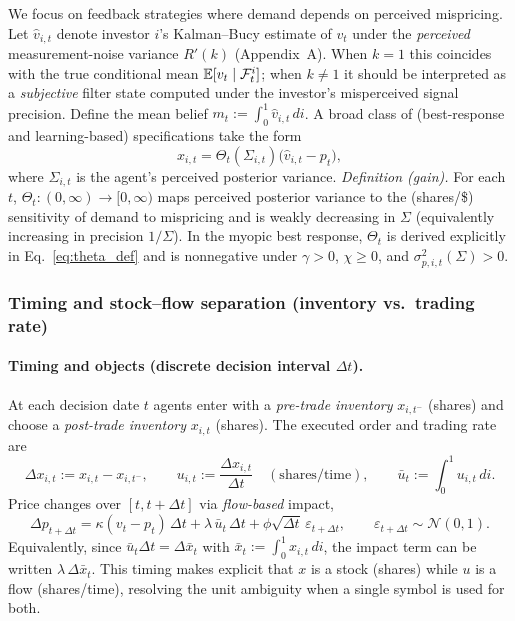 We focus on feedback strategies where demand depends on perceived mispricing. Let $\hat v_{i,t}$ denote investor $i$'s Kalman--Bucy estimate of $v_t$ under the \emph{perceived} measurement-noise variance $R'(k)$ (Appendix~A). When $k=1$ this coincides with the true conditional mean $\mathbb{E}[v_t\mid \mathcal F^i_t]$; when $k\ne 1$ it should be interpreted as a \emph{subjective} filter state computed under the investor's misperceived signal precision. Define the mean belief $m_t := \int_0^1 \hat v_{i,t}\,di$. A broad class of (best-response and learning-based) specifications take the form
\begin{equation}
x_{i,t} = \Theta_t(\Sigma_{i,t})\bigl(\hat v_{i,t}-p_t\bigr),
\label{eq:lin_policy}
\end{equation}
where $\Sigma_{i,t}$ is the agent's perceived posterior variance.
\emph{Definition (gain).} For each $t$, $\Theta_t:(0,\infty)\to[0,\infty)$ maps perceived posterior variance to the (shares/\$) sensitivity of demand to mispricing and is weakly decreasing in $\Sigma$ (equivalently increasing in precision $1/\Sigma$). In the myopic \CARA best response, $\Theta_t$ is derived explicitly in Eq.~\eqref{eq:theta_def} and is nonnegative under $\gamma>0$, $\chi\ge0$, and $\sigma^2_{p,i,t}(\Sigma)>0$.

\subsubsection{Timing and stock--flow separation (inventory vs.\ trading rate)}
\label{subsubsec:timing_stock_flow}

\paragraph{Timing and objects (discrete decision interval $\Delta t$).}
At each decision date $t$ agents enter with a \emph{pre-trade inventory} $x_{i,t^-}$ (shares) and choose a \emph{post-trade inventory} $x_{i,t}$ (shares). The executed order and trading rate are
\[
\Delta x_{i,t} := x_{i,t}-x_{i,t^-},\qquad
u_{i,t} := \frac{\Delta x_{i,t}}{\Delta t}\quad (\text{shares/time}),\qquad
\bar u_t := \int_0^1 u_{i,t}\,di.
\]
Price changes over $[t,t+\Delta t]$ via \emph{flow-based} impact,
\[
\Delta p_{t+\Delta t}
= \kappa (v_t-p_t)\,\Delta t + \lambda\,\bar u_t\,\Delta t + \phi\sqrt{\Delta t}\,\varepsilon_{t+\Delta t},
\qquad \varepsilon_{t+\Delta t}\sim\mathcal N(0,1).
\]
Equivalently, since $\bar u_t\Delta t = \Delta\bar x_t$ with $\bar x_t:=\int_0^1 x_{i,t}\,di$, the impact term can be written $\lambda\,\Delta\bar x_t$.
This timing makes explicit that $x$ is a stock (shares) while $u$ is a flow (shares/time), resolving the unit ambiguity when a single symbol is used for both.

